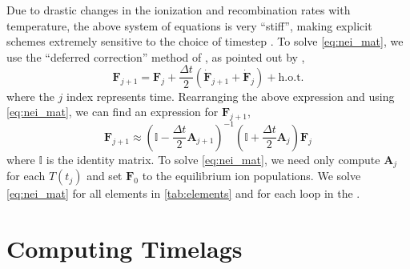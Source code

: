 Due to drastic changes in the ionization and recombination rates with temperature, the above system of equations is very ``stiff'', making explicit schemes extremely sensitive to the choice of timestep \citep{macneice_numerical_1984,bradshaw_numerical_2009}. To solve \autoref{eq:nei_mat}, we use the ``deferred correction'' method of \citet{npl_modern_1961}, as pointed out by \citet{macneice_numerical_1984},
\begin{equation}
    \mathbf{F}_{j+1} = \mathbf{F}_j + \frac{\Delta t}{2}(\dot{\mathbf{F}}_{j+1} + \dot{\mathbf{F}}_j) + \mathrm{h.o.t.}
\end{equation}
where the $j$ index represents time. Rearranging the above expression and using \autoref{eq:nei_mat}, we can find an expression for $\mathbf{F}_{j+1}$,
\begin{equation}
    \mathbf{F}_{j+1} \approx \left(\mathbb{I} - \frac{\Delta t}{2}\mathbf{A}_{j+1}\right)^{-1}\left(\mathbb{I} + \frac{\Delta t}{2}\mathbf{A}_{j}\right)\mathbf{F}_j
\end{equation}
where $\mathbb{I}$ is the identity matrix. To solve \autoref{eq:nei_mat}, we need only compute $\mathbf{A}_j$ for each $T(t_j)$ and set $\mathbf{F}_0$ to the equilibrium ion populations. We solve \autoref{eq:nei_mat} for all elements in \autoref{tab:elements} and for each loop in the \AR{}.


\section{Computing Timelags}\label{timelag_details}


